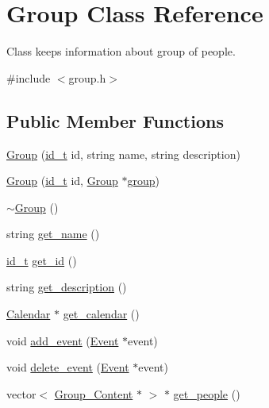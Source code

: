 \hypertarget{classGroup}{
\section{Group Class Reference}
\label{d0/db7/classGroup}
}


Class keeps information about group of people.  




{\ttfamily \#include $<$group.h$>$}

\subsection*{Public Member Functions}
\begin{DoxyCompactItemize}
\item 
\hyperlink{classGroup_aa5cdeec0897b7f37497fc4f6b30c548a}{Group} (\hyperlink{types_8h_ac948e8774f26ce7ea57a66b925e451b9}{id\_\-t} id, string name, string description)
\item 
\hyperlink{classGroup_af41a1bf48e082a4bbbc25b5f3e619696}{Group} (\hyperlink{types_8h_ac948e8774f26ce7ea57a66b925e451b9}{id\_\-t} id, \hyperlink{classGroup}{Group} $\ast$\hyperlink{group__content_8h_a27517aa1480ab2d9bfe5d62e693b33eb}{group})
\item 
\hyperlink{classGroup_aed00a22ff227ee2657ae44a5cbcedf7c}{$\sim$Group} ()
\item 
string \hyperlink{classGroup_aab2e4ec29eda3a490dede01eb9411f03}{get\_\-name} ()
\item 
\hyperlink{types_8h_ac948e8774f26ce7ea57a66b925e451b9}{id\_\-t} \hyperlink{classGroup_a622b4e08e2e00e16d91e6733c63b577b}{get\_\-id} ()
\item 
string \hyperlink{classGroup_ade4eb90fbeb5f50dfb2ccb262cd39ce8}{get\_\-description} ()
\item 
\hyperlink{classCalendar}{Calendar} $\ast$ \hyperlink{classGroup_a10f85a428de5c1215fd7d319bd1a9ca3}{get\_\-calendar} ()
\item 
void \hyperlink{classGroup_a8888e1a6507d004f3b5317fc9a65f005}{add\_\-event} (\hyperlink{classEvent}{Event} $\ast$event)
\item 
void \hyperlink{classGroup_a70b5f6f47818f5d4912926b29faa96bf}{delete\_\-event} (\hyperlink{classEvent}{Event} $\ast$event)
\item 
vector$<$ \hyperlink{structGroup__Content}{Group\_\-Content} $\ast$ $>$ $\ast$ \hyperlink{classGroup_a8578c69459be6971dd31e76357f934dc}{get\_\-people} ()
\item 

\end{DoxyCompactItemize}
